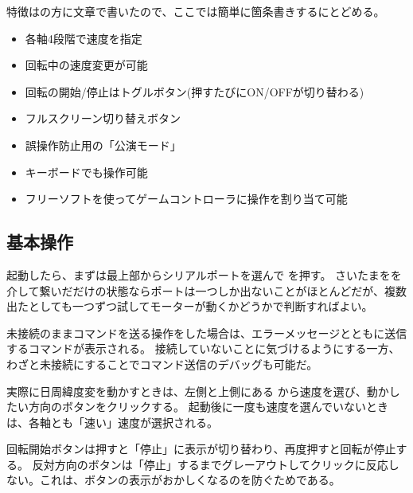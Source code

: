 \documentclass[letterpaper,10pt,dvipdfmx]{sphinxmanual}
\begin{document}
特徴は{\hyperref[\detokenize{nissyu-idohen/pc-software-history::doc}]{}}の方に文章で書いたので、ここでは簡単に箇条書きするにとどめる。

\begin{itemize}
\item {} 
各軸4段階で速度を指定

\item {} 
回転中の速度変更が可能

\item {} 
回転の開始/停止はトグルボタン(押すたびにON/OFFが切り替わる)

\item {} 
フルスクリーン切り替えボタン

\item {} 
誤操作防止用の「公演モード」

\item {} 
キーボードでも操作可能

\item {} 
フリーソフトを使ってゲームコントローラに操作を割り当て可能

\end{itemize}


\subsection{基本操作}
\label{\detokenize{nissyu-idohen/pc-software:}}\label{\detokenize{nissyu-idohen/pc-software:id4}}
起動したら、まずは最上部からシリアルポートを選んで を押す。
さいたまをを介して繋いだだけの状態ならポートは一つしか出ないことがほとんどだが、複数出たとしても一つずつ試してモーターが動くかどうかで判断すればよい。

未接続のままコマンドを送る操作をした場合は、エラーメッセージとともに送信するコマンドが表示される。
接続していないことに気づけるようにする一方、わざと未接続にすることでコマンド送信のデバッグも可能だ。

実際に日周緯度変を動かすときは、左側と上側にある から速度を選び、動かしたい方向のボタンをクリックする。
起動後に一度も速度を選んでいないときは、各軸とも「速い」速度が選択される。

回転開始ボタンは押すと「停止」に表示が切り替わり、再度押すと回転が停止する。
反対方向のボタンは「停止」するまでグレーアウトしてクリックに反応しない。これは、ボタンの表示がおかしくなるのを防ぐためである。
\end{document}
